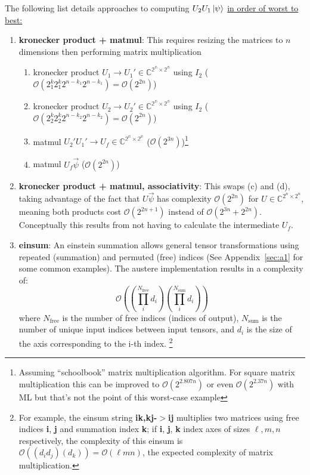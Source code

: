 \documentclass{article}
\begin{document}
The following list details approaches to computing $U_2 U_1 \ket{\psi}$ \underline{in order of worst to best:}
\begin{enumerate}
	\item \textbf{kronecker product + matmul}: This requires resizing the matrices to $n$ dimensions then performing matrix multiplication
	\begin{enumerate}
		\item kronecker product $U_1 \rightarrow U_1' \in \mathbb{C^{2^n \times 2^n}}$ using $I_2$ ($\mathcal{O}(2^k_1 2^k_1 2^{n-k_1} 2^{n-k_1}) = \mathcal{O}(2^{2n})$)
		\item kronecker product $U_2 \rightarrow U_2' \in \mathbb{C^{2^n \times 2^n}}$ using $I_2$ ($\mathcal{O}(2^k_2 2^k_2 2^{n-k_2} 2^{n-k_2}) = \mathcal{O}(2^{2n})$)
		\item matmul $U_2' U_1' \rightarrow U_f \in \mathbb{C^{2^n \times 2^n}}$ ($\mathcal{O}(2^{3n})$)\footnote{Assuming ``schoolbook'' matrix multiplication algorithm. For square matrix multiplication this can be improved to $\mathcal{O}(2^{2.807n})$ or even $\mathcal{O}(2^{2.37n})$ with ML but that's not the point of this worst-case example}
		\item matmul $ U_f \vec{\psi}$ ($\mathcal{O}(2^{2n})$)
	\end{enumerate}
	\item \textbf{kronecker product + matmul, associativity}: This swaps (c) and (d), taking advantage of the fact that $U \vec{\psi}$ has complexity $\mathcal{O}(2^{2n})$ for $U \in \mathbb{C}^{2^n \times 2^n}$, meaning both products cost $\mathcal{O}(2^{2n + 1})$ instead of $\mathcal{O}(2^{3n} + 2^{2n})$. Conceptually this results from not having to calculate the intermediate $U_f$.
	\item \textbf{einsum}: An einstein summation allows general tensor transformations using repeated (summation) and permuted (free) indices (See Appendix~\ref{sec:a1} for some common examples). The austere implementation results in a complexity of\cite{https://obilaniu6266h16.wordpress.com/2016/02/04/einstein-summation-in-numpy/}: 
	\begin{equation}
		\mathcal{O}\left( \left(\prod_i^{N_\text{free}} d_i\right) \left(\prod_i^{N_\text{sum}} d_i\right) \right)
	\end{equation}
	where $N_\text{free}$ is the number of free indices (indices of output), $N_\text{sum}$ is the number of unique input indices between input tensors, and $d_i$ is the size of the axis corresponding to the i-th index. \footnote{For example, the einsum string \textbf{ik,kj-$>$ij} multiplies two matrices using free indices \textbf{i}, \textbf{j} and summation index \textbf{k}; if \textbf{i}, \textbf{j}, \textbf{k} index axes of sizes $\ell,m,n$ respectively, the complexity of this einsum is 	$\mathcal{O}( (d_i d_j) (d_k) ) = \mathcal{O}( \ell mn)$, the expected complexity of matrix multiplication.}
	

\end{enumerate}
\end{document}
